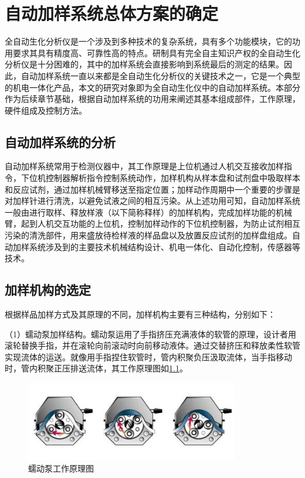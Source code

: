 \chapter{自动加样系统总体方案的确定}
全自动生化分析仪是一个涉及到多种技术的复杂系统，具有多个功能模块，它的功用要求其具有精度高、可靠性高的特点。研制具有完全自主知识产权的全自动生化分析仪是十分困难的，其中的加样系统会直接影响到系统最后的测定的结果。因此，自动加样系统一直以来都是全自动生化分析仪的关键技术之一，它是一个典型的机电一体化产品，本文的研究对象即为全自动生化仪中的自动加样系统。本部分作为后续章节基础，根据自动加样系统的功用来阐述其基本组成部件，工作原理，硬件组成及控制方法。

\section{自动加样系统的分析}

自动加样系统常用于检测仪器中，其工作原理是上位机通过人机交互接收加样指令，下位机控制器解析指令控制系统动作，加样机构从样本盘和试剂盘中吸取样本和反应试剂，通过加样机械臂移送至指定位置；加样动作周期中一个重要的步骤是对加样针进行清洗，以避免试液之间的相互污染。从上述功用可知，自动加样系统一般由进行取样、释放样液（以下简称释样）的加样机构，完成加样功能的机械臂，起到人机交互功能的上位机，控制加样动作的下位机控制器，为防止试剂相互污染的清洗部件，用来盛放待检样液的样品盘以及放置反应试剂的加样盘组成。自动加样系统涉及到的主要技术机械结构设计、机电一体化、自动化控制，传感器等技术。

\section{加样机构的选定}
根据样品加样方式及其原理的不同，加样机构主要有三种结构\supercite{bib3}，分别如下：

（1）蠕动泵加样结构。蠕动泵运用了手指挤压充满液体的软管的原理，设计者用滚轮替换手指，并在滚轮向前滚动时向前移动液体。通过交替挤压和释放柔性软管实现流体的运送。就像用手指捏住软管时，管内积聚负压汲取流体，当手指移动时，管内积聚正压排送流体，其工作原理图如\ref{fig:2-1}。

\begin{figure}[htbp!]
  \centering
  \includegraphics[height=3.5cm]{chap/figure/2-1.jpg}
  \caption{蠕动泵工作原理图}
  \label{fig:2-1}
\end{figure}

